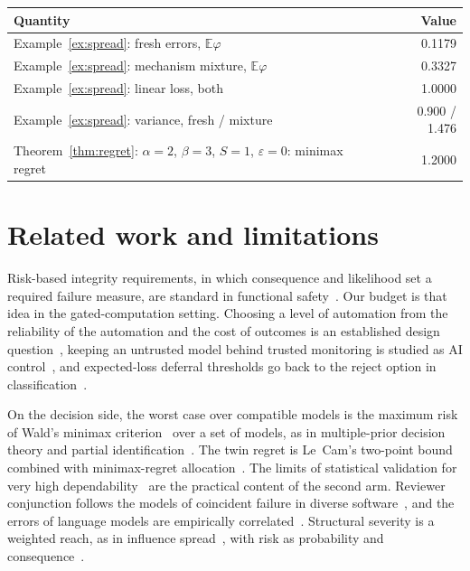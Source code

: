 \documentclass[11pt]{article}
\theoremstyle{definition}
\theoremstyle{remark}
\newcommand{\E}{\mathbb E}
\begin{document}
\begin{center}\small
\begin{tabular}{p{}r}
\toprule Quantity & Value\\\midrule
Example~\ref{ex:spread}: fresh errors, $\E\varphi$ & 0.1179\\
Example~\ref{ex:spread}: mechanism mixture, $\E\varphi$ & 0.3327\\
Example~\ref{ex:spread}: linear loss, both & 1.0000\\
Example~\ref{ex:spread}: variance, fresh / mixture & 0.900 / 1.476\\
Theorem~\ref{thm:regret}: $\alpha=2$, $\beta=3$, $S=1$, $\varepsilon=0$: minimax regret & 1.2000\\
\bottomrule
\end{tabular}
\end{center}

\section{Related work and limitations}\label{sec:related}
Risk-based integrity requirements, in which consequence and likelihood set a required failure
measure, are standard in functional safety~\cite{iec61508}. Our budget is that idea in the
gated-computation setting. Choosing a level of automation from the reliability of the automation and
the cost of outcomes is an established design question~\cite{parasuraman00}, keeping an untrusted model
behind trusted monitoring is studied as AI control~\cite{greenblatt23}, and expected-loss deferral
thresholds go back to the reject option in classification~\cite{chow70}.

On the decision side, the worst case over compatible models is the maximum risk of Wald's minimax
criterion~\cite{wald45} over a set of models, as in multiple-prior decision theory and partial identification~\cite{gilboa89,manski00}.
The twin regret is Le~Cam's two-point bound~\cite{lecam73} combined with minimax-regret
allocation~\cite{manski05,manski09}. The limits of statistical validation for very high
dependability~\cite{littlewood93,butler93} are the practical content of the second arm. Reviewer
conjunction follows the models of coincident failure in diverse software~\cite{eckhardt85,littlewood89,lps01},
and the errors of language models are empirically correlated~\cite{kim25}. Structural severity is a
weighted reach, as in influence spread~\cite{kempe03}, with risk as probability and
consequence~\cite{kaplan81}.
\end{document}
